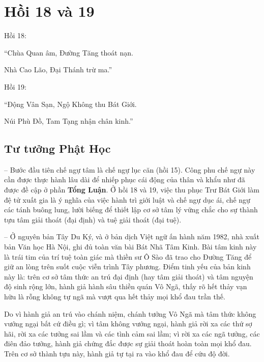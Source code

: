 \chapter{Hồi 18 và 19} %
\label{cha:hoi_18_19}

Hồi 18:

\begin{itshape}
``Chùa Quan âm, Đường Tăng thoát nạn.

Nhà Cao Lão, Đại Thánh trừ ma.''

\end{itshape}

Hồi 19:

\begin{itshape}
``Động Vân Sạn, Ngộ Không thu Bát Giới.

Núi Phù Đồ, Tam Tạng nhận chân kinh.''
\end{itshape}

\section{Tư tưởng Phật Học} %
\label{sec:18_19_phat_hoc}

-- Bước đầu tiên chế ngự tâm là chế ngự lục căn (hồi 15). Công phu chế ngự này cần được thực hành lâu dài để nhiếp phục cái động của thân và khẩu như đã được đề cập ở phần {\bf Tổng Luận}. Ở hồi 18 và 19, việc thu phục Trư Bát Giới làm đệ tử xuất gia là ý nghĩa của việc hành trì giới luật và chế ngự dục ái, chế ngự các tánh buông lung, lười biếng để thiết lập cơ sở tâm lý vững chắc cho sự thành tựu tâm giải thoát (đại định) và tuệ giải thoát (đại tuệ).

-- Ở nguyên bản Tây Du Ký, và ở bản dịch Việt ngữ ấn hành năm 1982, nhà xuất bản Văn học Hà Nội, ghi đủ toàn văn bài Bát Nhã Tâm Kinh. Bài tâm kinh này là trái tim của trí tuệ toàn giác mà thiền sư Ô Sào đã trao cho Đường Tăng để giữ an lòng trên suốt cuộc viễn trình Tây phương. Điểm tinh yếu của bản kinh này là: trên cơ sở tâm thức an trú đại định (hay tâm giải thoát) và tâm nguyện độ sinh rộng lớn, hành giả hành sâu thiền quán Vô Ngã, thấy rõ hết thảy vạn hữu là rỗng không tự ngã mà vượt qua hết thảy mọi khổ đau trần thế.

Do vì hành giả an trú vào chánh niệm, chánh tưởng Vô Ngã mà tâm thức không vướng ngại bất cứ điều gì; vì tâm không vướng ngại, hành giả rời xa các thứ sợ hãi, rời xa các tưởng sai lầm và các tình cảm sai lầm; vì rời xa các ngã tưởng, các điên đảo tưởng, hành giả chứng đắc được sự giải thoát hoàn toàn mọi khổ đau. Trên cơ sở thành tựu này, hành giả tự tại ra vào khổ đau để cứu độ đời.

